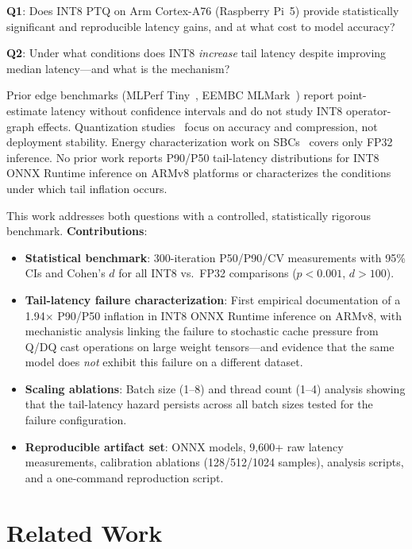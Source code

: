\documentclass[journal]{IEEEtran}
\begin{document}
\textbf{Q1}: Does INT8 PTQ on Arm Cortex-A76 (Raspberry Pi~5) provide statistically significant and reproducible latency gains, and at what cost to model accuracy?

\textbf{Q2}: Under what conditions does INT8 \emph{increase} tail latency despite improving median latency—and what is the mechanism?

Prior edge benchmarks (MLPerf Tiny~\cite{banbury2021mlperf}, EEMBC MLMark~\cite{eembc2023mlmark}) report point-estimate latency without confidence intervals and do not study INT8 operator-graph effects. Quantization studies~\cite{jacob2018quantization,krishnamoorthi2018quantizing,wu2020mixed} focus on accuracy and compression, not deployment stability. Energy characterization work on SBCs~\cite{bacciu2021experimental} covers only FP32 inference. No prior work reports P90/P50 tail-latency distributions for INT8 ONNX Runtime inference on ARMv8 platforms or characterizes the conditions under which tail inflation occurs.

This work addresses both questions with a controlled, statistically rigorous benchmark. \textbf{Contributions}:
\begin{itemize}
  \item \textbf{Statistical benchmark}: 300-iteration P50/P90/CV measurements with 95\% CIs and Cohen's $d$ for all INT8 vs.\ FP32 comparisons ($p < 0.001$, $d > 100$).
  \item \textbf{Tail-latency failure characterization}: First empirical documentation of a 1.94$\times$ P90/P50 inflation in INT8 ONNX Runtime inference on ARMv8, with mechanistic analysis linking the failure to stochastic cache pressure from Q/DQ cast operations on large weight tensors—and evidence that the same model does \emph{not} exhibit this failure on a different dataset.
  \item \textbf{Scaling ablations}: Batch size (1--8) and thread count (1--4) analysis showing that the tail-latency hazard persists across all batch sizes tested for the failure configuration.
  \item \textbf{Reproducible artifact set}: ONNX models, 9,600+ raw latency measurements, calibration ablations (128/512/1024 samples), analysis scripts, and a one-command reproduction script.
\end{itemize}

\section{Related Work}
\end{document}
